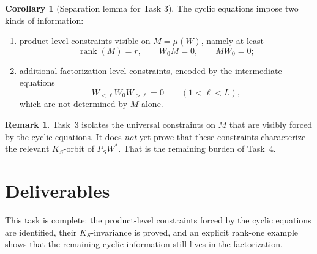 \documentclass{article}
\newcommand{\rk}{\operatorname{rank}}
\theoremstyle{definition}
\newtheorem{corollary}[theorem]{Corollary}
\newtheorem{remark}[theorem]{Remark}
\begin{document}
\begin{corollary}[Separation lemma for Task 3]\label{cor:separation-lemma}
The cyclic equations impose two kinds of information:
\begin{enumerate}
\item product-level constraints visible on $M=\mu(W)$, namely at least
\[
\rk(M)=r,
\qquad
W_0M=0,
\qquad
MW_0=0;
\]
\item additional factorization-level constraints, encoded by the intermediate equations
\[
W_{<\ell}W_0W_{>\ell}=0
\qquad (1<\ell<L),
\]
which are not determined by $M$ alone.
\end{enumerate}
\end{corollary}

\begin{remark}
Task~3 isolates the universal constraints on $M$ that are visibly forced by the cyclic equations. It does \emph{not} yet prove that these constraints characterize the relevant $K_S$-orbit of $P_SW^\ast$. That is the remaining burden of Task~4.
\end{remark}

\section{Deliverables}

This task is complete: the product-level constraints forced by the cyclic equations are identified, their $K_S$-invariance is proved, and an explicit rank-one example shows that the remaining cyclic information still lives in the factorization.
\end{document}
